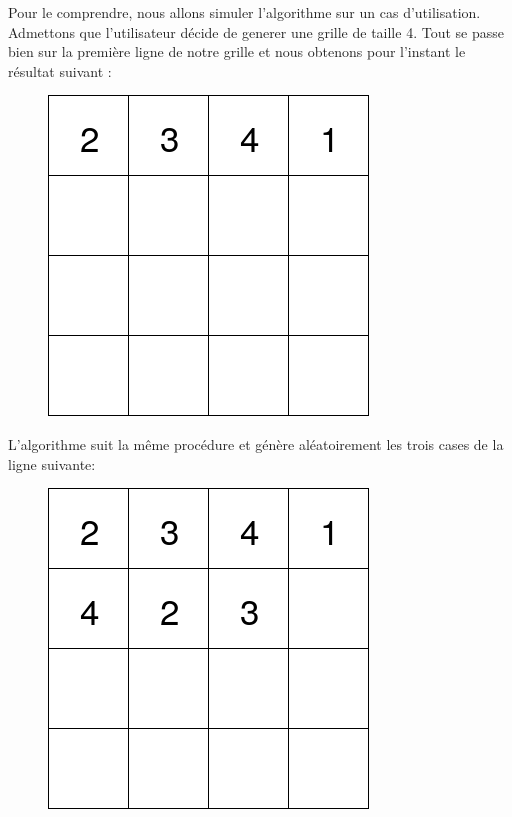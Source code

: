 \documentclass[1]{report}
\begin{document}
\begin{itemize}
        Pour le comprendre, nous allons simuler l'algorithme sur un cas d'utilisation. Admettons que l'utilisateur décide de generer une grille de taille 4. Tout se passe bien sur la première ligne de notre grille et nous obtenons pour l'instant le résultat suivant : \newline
        
        \end{itemize}

        \begin{figure}[h]
            \centering
                \includegraphics[scale=0.4]{2341.png}
        \end{figure}
        
        \newpage

        L'algorithme suit la même procédure et génère aléatoirement les trois cases de la ligne suivante: \newline

        \begin{figure}[h]
            \centering
                \includegraphics[scale=0.4]{423.png}
        \end{figure}
\end{document}
